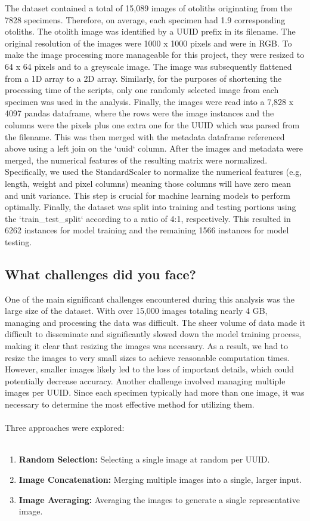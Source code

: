 The dataset contained a total of 15,089 images of otoliths originating from the 7828 specimens.
Therefore, on average, each specimen had 1.9 corresponding otoliths.
The otolith image was identified by a UUID prefix in its filename.
The original resolution of the images were 1000 x 1000 pixels and were in RGB.
To make the image processing more manageable for this project, they were resized to 64 x 64 pixels and to a greyscale image.
The image was subsequently flattened from a 1D array to a 2D array.
Similarly, for the purposes of shortening the processing time of the scripts, only one randomly selected image from each specimen was used in the analysis.
Finally, the images were read into a 7,828 x 4097 pandas dataframe, where the rows were the image instances and the columns were the pixels plus one extra one for the UUID which was parsed from the filename.
This was then merged with the metadata dataframe referenced above using a left join on the `uuid` column.
After the images and metadata were merged, the numerical features of the resulting matrix were normalized.
Specifically, we used the StandardScaler to normalize the numerical features (e.g, length, weight and pixel columns) meaning those columns will have zero mean and unit variance.
This step is crucial for machine learning models to perform optimally.
Finally, the dataset was split into training and testing portions using the `train\_test\_split` according to a ratio of 4:1, respectively.
This resulted in 6262 instances for model training and the remaining 1566 instances for model testing.

\subsection{What challenges did you face?}

One of the main significant challenges encountered during this analysis was the large size of the dataset.
With over 15,000 images totaling nearly 4 GB, managing and processing the data was difficult.
The sheer volume of data made it difficult to disseminate and significantly slowed down the model training process, making it clear that resizing the images was necessary.
As a result, we had to resize the images to very small sizes to achieve reasonable computation times.
However, smaller images likely led to the loss of important details, which could potentially decrease accuracy.
Another challenge involved managing multiple images per UUID.
Since each specimen typically had more than one image, it was necessary to determine the most effective method for utilizing them.
\\~\\
Three approaches were explored:
\\~\\
\begin{enumerate}
    \item \textbf{Random Selection:} Selecting a single image at random per UUID.
    \item \textbf{Image Concatenation:} Merging multiple images into a single, larger input.
    \item \textbf{Image Averaging:} Averaging the images to generate a single representative image.
\end{enumerate}

